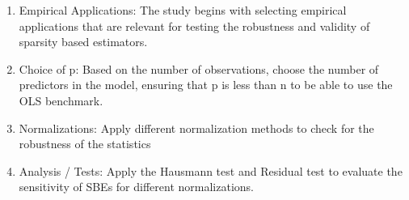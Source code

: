 \begin{enumerate}
    \item Empirical Applications: The study begins with selecting empirical applications that are relevant for testing the robustness and validity of sparsity based estimators.
    \item Choice of p: Based on the number of observations, choose the number of predictors in the model, ensuring that p is less than n to be able to use the OLS benchmark.
    \item Normalizations: Apply different normalization methods to check for the robustness of the statistics
    \item Analysis / Tests: Apply the Hausmann test and Residual test to evaluate the sensitivity of SBEs for different normalizations.
\end{enumerate}



